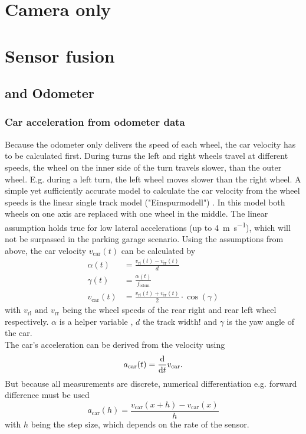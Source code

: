 \section{Camera only}



\section{Sensor fusion}


\subsection{ and Odometer}

\subsubsection{Car acceleration from odometer data}
Because the odometer only delivers the speed of each wheel, the car velocity has to be calculated first.
During turns the left and right wheels travel at different speeds, the wheel on the inner side of the turn travels slower, than the outer wheel.
E.g. during a left turn, the left wheel moves slower than the right wheel.
A simple yet sufficiently accurate model to calculate the car velocity from the wheel speeds is the linear single track model ("Einspurmodell") \cite{Mitschke2014}.
In this model both wheels on one axis are replaced with one wheel in the middle.
The linear assumption holds true for low lateral accelerations (up to \SI{4}{\metre\per\second}), which will not be surpassed in the parking garage scenario.
Using the assumptions from above, the car velocity $v_\mathrm{car}(t)$ can be calculated by
\begin{align}
	\alpha(t)         & = \frac{v_\mathrm{rl}(t) - v_\mathrm{rr}(t)}{d}                  \\
	\gamma(t)         & = \frac{\alpha(t)}{f_\mathrm{odom}}                              \\
	v_\mathrm{car}(t) & = \frac{v_\mathrm{rl}(t) + v_\mathrm{rr}(t)}{2}\cdot\cos(\gamma)
\end{align}
with $v_\mathrm{rl} \text{ and } v_\mathrm{rr}$ being the wheel speeds of the rear right and rear left wheel respectively.
$\alpha$ is a helper variable , $d$ the track width! and $\gamma$ is the yaw angle of the car.\\
The car's acceleration can be derived from the velocity using
\begin{equation}
	a_\mathrm{car}(t) = \dv{t}v_\mathrm{car}.
\end{equation}
But because all measurements are discrete, numerical differentiation e.g. forward difference must be used
\begin{equation}
	a_\mathrm{car}(h) = \frac{v_\mathrm{car}(x + h) - v_\mathrm{car}(x)}{h}
\end{equation}
with $h$ being the step size, which depends on the rate of the sensor.


